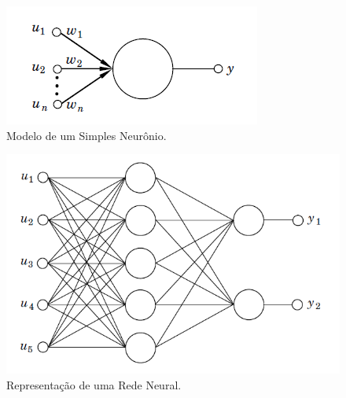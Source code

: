 \begin{figure}[htb]
  \caption{Modelo de um Simples Neurônio.}
  \begin{center}
      \includegraphics[scale=0.6]{img/neuron_astrom_p295}
  \end{center}
  \label{fig:neuron_astrom_p295}
\end{figure}

\begin{figure}[htb]
  \caption{Representação de uma Rede Neural.}
  \begin{center}
      \includegraphics[scale=0.65]{img/feedforward_neural_astrom_p297}
  \end{center}
  \label{fig:feedforward_neural_astrom_p297}
\end{figure}

